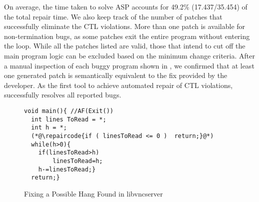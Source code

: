 On average, the time taken to solve ASP accounts for 49.2\% (17.437/35.454) of the total repair time. We also keep track of the number of patches that successfully eliminate the CTL violations. More than one patch is available for non-termination bugs, as some patches exit the entire program without entering the loop. 
While all the patches listed are valid, those that intend to cut off the main program logic can be excluded based on the minimum change criteria. 
After a manual inspection of each buggy program shown in , we confirmed that at least one generated patch is semantically equivalent to the fix provided by the developer. 
As the first tool to achieve automated repair of CTL violations, \toolName successfully resolves all reported bugs. 



\begin{figure}[!t]
\begin{lstlisting}[xleftmargin=6em,numbersep=6pt,basicstyle=\footnotesize\ttfamily]
void main(){ //AF(Exit())
  int lines ToRead = *;
  int h = *;
  (*@\repaircode{if ( linesToRead <= 0 )  return;}@*)
  while(h>0){
    if(linesToRead>h)  
        linesToRead=h; 
    h-=linesToRead;} 
  return;}
\end{lstlisting}
\caption{Fixing a Possible Hang Found in libvncserver \cite{LibVNCClient}}
\label{fig:term-Patched-program}
\end{figure}

